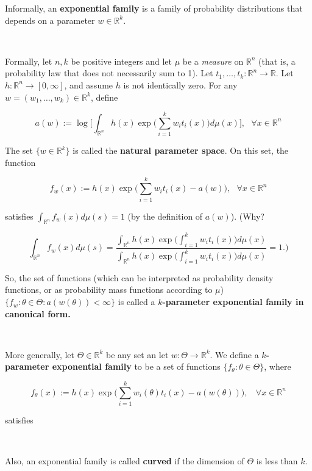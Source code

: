 \begin{definition}\label{prob.defn.exp.fams} Informally, an \textbf{exponential family} is a family of probability distributions that depends on a parameter \(w \in \mathbb{R}^k\). 

\

Formally, let \(n, k\) be positive integers and let \(\mu\) be a \textit{measure} on \(\mathbb{R}^n\) (that is, a probability law that does not necessarily sum to 1). Let \(t_1, \ldots, t_k : \mathbb{R}^n \to \mathbb{R}\). Let \(h: \mathbb{R}^n \to [0, \infty]\), and assume \(h\) is not identically zero. For any \(w = (w_1, \ldots, w_k) \in \mathbb{R}^k\), define

\[
a(w) := \log \bigg[ \int_{\mathbb{R}^n} h(x) \exp \bigg( \sum_{i=1}^k w_i t_i(x) \bigg) d \mu(x) \bigg], \ \ \ \forall x \in \mathbb{R}^n
\]

The set \(\{w \in \mathbb{R}^k\}\) is called the \textbf{natural parameter space}. On this set, the function

\[
f_w(x) := h(x) \exp \bigg( \sum_{i=1}^k w_i t_i(x) - a(w) \bigg), \ \ \ \forall x \in \mathbb{R}^n
\]

satisfies \(\int_{\mathbb{R}^n} f_w(x) d \mu(s) = 1\) (by the definition of \(a(w)\)). (Why? 

\[
 \int_{\mathbb{R}^n} f_w(x) d \mu(s) = \frac{\int_{\mathbb{R}^n} h(x)  \exp \bigg( \int_{i=1}^k w_i t_i(x) \bigg) d \mu(x) }{\int_{\mathbb{R}^n} h(x)  \exp \bigg( \int_{i=1}^k w_i t_i(x) \bigg) d \mu(x)} = 1.)
 \]
 
 So, the set of functions (which can be interpreted as probability density functions, or as probability mass functions according to \(\mu\)) \(\{f_w: \theta \in \Theta: a(w(\theta)) < \infty \}\) is called a \textbf{\(k\)-parameter exponential family in canonical form.} 
 
 \
 
 More generally, let \(\Theta \in \mathbb{R}^k\) be any set an let \(w: \Theta \to \mathbb{R}^k\). We define a \textbf{\(k\)-parameter exponential family} to be a set of functions \(\{f_{\theta}: \theta \in \Theta\}\), where
 
 \[
 f_{\theta}(x) := h(x) \exp \bigg( \sum_{i=1}^k w_i(\theta) t_i(x) - a(w(\theta))\bigg), \ \ \ \ \forall x \in \mathbb{R}^n
 \]
 
 satisfies 
 
 \
 
 Also, an exponential family is called \textbf{curved} if the dimension of \(\Theta\) is less than \(k\).

\end{definition}

